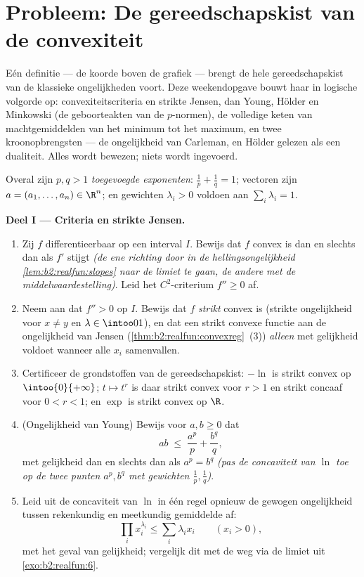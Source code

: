 \section{Probleem: De gereedschapskist van de convexiteit}

Eén definitie --- de koorde boven de grafiek --- brengt de hele
gereedschapskist van de klassieke ongelijkheden voort. Deze
weekendopgave bouwt haar in logische volgorde op:
convexiteitscriteria en strikte Jensen, dan Young, Hölder en
Minkowski (de geboorteakten van de $p$-normen), de volledige keten
van machtgemiddelden van het minimum tot het maximum, en twee
kroonopbrengsten --- de ongelijkheid van Carleman, en Hölder
gelezen als een dualiteit. Alles wordt bewezen; niets wordt
ingevoerd.

\begin{problem}
\label{pb:b2:realfun:1}
Overal zijn $p, q > 1$ \emph{toegevoegde exponenten}: $\frac1p +
\frac1q = 1$; vectoren zijn $a = (a_1, \dots, a_n) \in \R^n$; en
gewichten $\lambda_i > 0$ voldoen aan $\sum_i\lambda_i = 1$.

\medskip
\noindent\textbf{Deel I --- Criteria en strikte Jensen.}
\begin{enumerate}
  \item Zij $f$ differentieerbaar op een interval $I$. Bewijs dat
        $f$ convex is dan en slechts dan als $f'$ stijgt \emph{(de
        ene richting door in de hellingsongelijkheid
        \cref{lem:b2:realfun:slopes} naar de limiet te gaan, de
        andere met de middelwaardestelling)}. Leid het
        $C^2$-criterium $f'' \geq 0$ af.
  \item Neem aan dat $f'' > 0$ op $I$. Bewijs dat $f$
        \emph{strikt} convex is (strikte ongelijkheid voor $x \neq
        y$ en $\lambda \in \intoo01$), en dat een strikt convexe
        functie aan de ongelijkheid van Jensen
        (\cref{thm:b2:realfun:convexreg}~(3)) \emph{alleen} met
        gelijkheid voldoet wanneer alle $x_i$ samenvallen.
  \item Certificeer de grondstoffen van de gereedschapskist:
        $-\ln$ is strikt convex op $\intoo{0}{+\infty}$; $t \mapsto
        t^r$ is daar strikt convex voor $r > 1$ en strikt concaaf
        voor $0 < r < 1$; en $\exp$ is strikt convex op $\R$.
  \item (Ongelijkheid van Young) Bewijs voor $a, b \geq 0$ dat
        \[
        ab \;\leq\; \frac{a^p}{p} + \frac{b^q}{q},
        \]
        met gelijkheid dan en slechts dan als $a^p = b^q$
        \emph{(pas de concaviteit van $\ln$ toe op de twee punten
        $a^p, b^q$ met gewichten $\frac1p, \frac1q$)}.
  \item Leid uit de concaviteit van $\ln$ in één regel opnieuw de
        gewogen ongelijkheid tussen rekenkundig en meetkundig
        gemiddelde af:
        \[
        \prod_i x_i^{\lambda_i} \leq \sum_i\lambda_ix_i \qquad
        (x_i > 0),
        \]
        met het geval van gelijkheid; vergelijk dit met de weg via
        de limiet uit \cref{exo:b2:realfun:6}.
\end{enumerate}


\end{problem}

